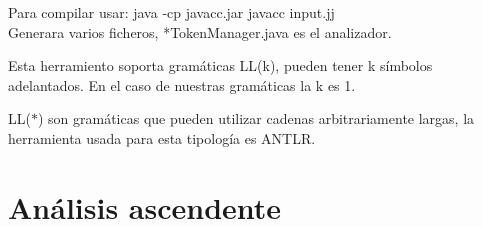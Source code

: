 \documentclass[\main/ApuntesPL.tex]{subfiles}
\begin{document}
      \bigskip
      \par
      Para compilar usar: java -cp javacc.jar javacc input.jj\\
      Generara varios ficheros, *TokenManager.java es el analizador.

      \bigskip
      \par
      Esta herramiento soporta gramáticas LL(k), pueden tener k símbolos adelantados. En el caso de
      nuestras gramáticas la k es 1.

      \bigskip
      \par
      LL($\ast$) son gramáticas que pueden utilizar cadenas arbitrariamente largas, la herramienta
      usada para esta tipología es ANTLR.

  \section{Análisis ascendente}
\end{document}
